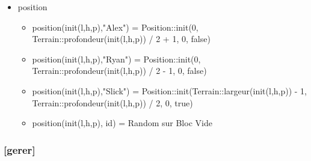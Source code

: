 \documentclass[11pt]{article}
\begin{document}
\begin{itemize}
\item position\\
\label{sec-1.7.2.5}

\begin{itemize}

\item position(init(l,h,p),"Alex") = Position::init(0, Terrain::profondeur(init(l,h,p)) / 2 + 1, 0, false)\\
\label{sec-1.7.2.5.1}


\item position(init(l,h,p),"Ryan") = Position::init(0, Terrain::profondeur(init(l,h,p)) / 2 - 1, 0, false)\\
\label{sec-1.7.2.5.2}


\item position(init(l,h,p),"Slick") = Position::init(Terrain::largeur(init(l,h,p)) - 1, Terrain::profondeur(init(l,h,p)) / 2, 0, true)\\
\label{sec-1.7.2.5.3}


\item position(init(l,h,p), id) = Random sur Bloc Vide\\
\label{sec-1.7.2.5.4}







\end{itemize} %
\end{itemize} %
\subsubsection{[gerer]}
\label{sec-1.7.3}
\end{document}
